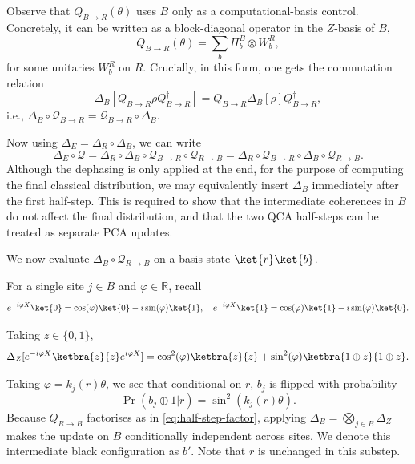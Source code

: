 Observe that \(Q_{B\to R}(\theta)\) uses \(B\) only as a computational-basis control. Concretely, it can be written as a block-diagonal operator in the \(Z\)-basis of \(B\),
\begin{equation}
    Q_{B\to R}(\theta) = \sum_b \Pi_b^B \otimes W^R_b,
\end{equation}
for some unitaries \(W_b^R\) on \(R\). Crucially, in this form, one gets the commutation relation
\begin{equation}
    \Delta_B[Q_{B \to R} \rho Q_{B \to R}^\dagger] = Q_{B \to R} \Delta_B[\rho] Q_{B \to R}^\dagger,
\end{equation}
i.e., \(\Delta_B \circ \mathcal{Q}_{B \to R} = \mathcal{Q}_{B \to R} \circ \Delta_B\).

Now using \(\Delta_E = \Delta_R \circ \Delta_B\), we can write
\begin{equation}
    \Delta_E \circ \mathcal{Q} = \Delta_R \circ \Delta_B \circ \mathcal{Q}_{B \to R} \circ \mathcal{Q}_{R \to B} = \Delta_R \circ \mathcal{Q}_{B \to R} \circ \Delta_B \circ \mathcal{Q}_{R \to B}.
\end{equation}
Although the dephasing is only applied at the end, for the purpose of computing the final classical distribution, we may equivalently insert \(\Delta_B\) immediately after the first half-step. This is required to show that the intermediate coherences in \(B\) do not affect the final distribution, and that the two QCA half-steps can be treated as separate PCA updates.

We now evaluate \(\Delta_B \circ \mathcal{Q}_{R \to B}\) on a basis state \(\ket{r}\ket{b}\).

For a single site \(j \in B\) and \(\varphi \in \mathbb{R}\), recall
\begin{equation}
    e^{-i\varphi X} \ket{0} = \cos(\varphi) \ket{0} - i \sin(\varphi) \ket{1}, \quad
    e^{-i\varphi X} \ket{1} = \cos(\varphi) \ket{1} - i \sin(\varphi) \ket{0}.
\end{equation}

Taking \(z \in \{0,1\}\),
\begin{equation}
    \Delta_Z[e^{-i\varphi X} \ketbra{z}{z} e^{i\varphi X}] = \cos^2(\varphi) \ketbra{z}{z} + \sin^2(\varphi) \ketbra{1\oplus z}{1\oplus z}.
\end{equation}

Taking \(\varphi = k_j(r) \theta\), we see that conditional on \(r\), \(b_j\) is flipped with probability
\begin{equation}\label{eq:pca-flip-prob}
    \Pr(b_j \oplus 1 | r) = \sin^2(k_j(r) \theta).
\end{equation}
Because \(Q_{R \to B}\) factorises as in \cref{eq:half-step-factor}, applying \(\Delta_B = \bigotimes_{j \in B} \Delta_Z\) makes the update on \(B\) conditionally independent across sites. We denote this intermediate black configuration as \(b'\). Note that \(r\) is unchanged in this substep.

